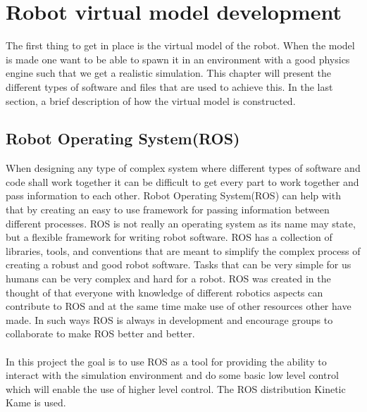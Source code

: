 \chapter{Robot virtual model development}\label{chap:soft}
The first thing to get in place is the virtual model of the robot. When the model is made one want to be able to spawn it in an environment with a good physics engine such that we get a realistic simulation. This chapter will present the different types of software and files that are used to achieve this. In the last section, a brief description of how the virtual model is constructed.   %




\section{Robot Operating System(ROS)}
When designing any type of complex system where different types of software and code shall work together it can be difficult to get every part to work together and pass information to each other. Robot Operating System(ROS) can help with that by creating an easy to use framework for passing information between different processes\cite{ROS}. ROS is not really an operating system as its name may state, but a flexible framework for writing robot software\cite{ROS}. ROS has a collection of libraries, tools, and conventions that are meant to simplify the complex process of creating a robust and good robot software. Tasks that can be very simple for us humans can be very complex and hard for a robot. ROS was created in the thought of that everyone with knowledge of different robotics aspects can contribute to ROS and at the same time make use of other resources other have made. In such ways ROS is always in development and encourage groups to collaborate to make ROS better and better. \\\\
In this project the goal is to use ROS as a tool for providing the ability to interact with the simulation environment and do some basic low level control which will enable the use of higher level control. The ROS distribution Kinetic Kame is used\cite{ROS}.


